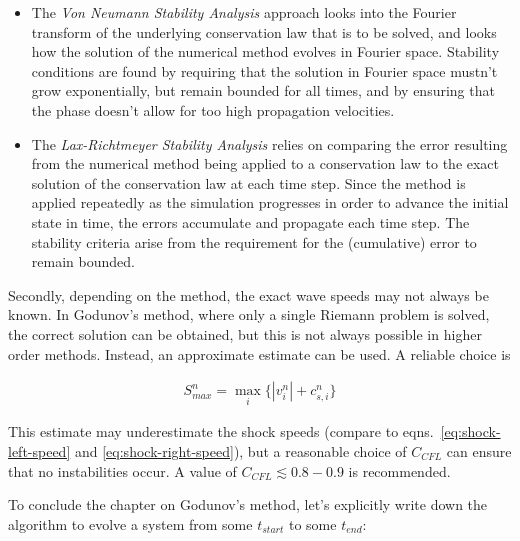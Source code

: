 \begin{itemize}
 \item The \emph{Von Neumann Stability Analysis} approach looks into the Fourier transform of the
underlying conservation law that is to be solved, and looks how the solution of the numerical method
evolves in Fourier space. Stability conditions are found by requiring that the solution in Fourier
space mustn't grow exponentially, but remain bounded for all times, and by ensuring that the phase
doesn't allow for too high propagation velocities.

\item The \emph{Lax-Richtmeyer Stability Analysis} relies on comparing the error resulting from the
numerical method being applied to a conservation law to the exact solution of the conservation law
at each time step. Since the method is applied repeatedly as the simulation progresses in order to
advance the initial state in time, the errors accumulate and propagate each time step. The stability
criteria arise from the requirement for the (cumulative) error to remain bounded.

\end{itemize}




Secondly, depending on the method, the exact wave speeds may not always be known. In Godunov's
method, where only a single Riemann problem is solved, the correct solution can be obtained, but
this is not always possible in higher order methods. Instead, an approximate estimate can be used. A
reliable choice is

\begin{align}
	S^n_{max} = \max_i\{ |v_i^n| + c_{s,i}^n \} \label{eq:wavespeed-estimate-godunov}
\end{align}

This estimate may underestimate the shock speeds (compare to eqns.~\ref{eq:shock-left-speed} and
\ref{eq:shock-right-speed}), but a reasonable choice of $C_{CFL}$ can ensure that no instabilities
occur. A value of $C_{CFL} \lesssim 0.8 - 0.9$ is recommended.


To conclude the chapter on Godunov's method, let's explicitly write down the algorithm to evolve a
system from some $t_{start}$ to some $t_{end}$:


